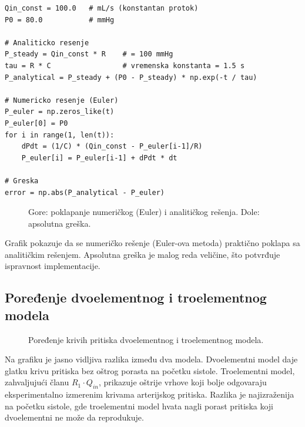 \documentclass[12pt,a4paper]{article}
\begin{document}
\begin{lstlisting}[caption={Validacija: poređenje numeričkog i analitičkog rešenja.},label={lst:valid}]
Qin_const = 100.0   # mL/s (konstantan protok)
P0 = 80.0           # mmHg

# Analiticko resenje
P_steady = Qin_const * R    # = 100 mmHg
tau = R * C                 # vremenska konstanta = 1.5 s
P_analytical = P_steady + (P0 - P_steady) * np.exp(-t / tau)

# Numericko resenje (Euler)
P_euler = np.zeros_like(t)
P_euler[0] = P0
for i in range(1, len(t)):
    dPdt = (1/C) * (Qin_const - P_euler[i-1]/R)
    P_euler[i] = P_euler[i-1] + dPdt * dt

# Greska
error = np.abs(P_analytical - P_euler)
\end{lstlisting}

\begin{figure}[H]
    \centering
    \caption{Gore: poklapanje numeričkog (Euler) i analitičkog rešenja. Dole: apsolutna greška.}
    \label{fig:valid}
\end{figure}

Grafik pokazuje da se numeričko rešenje (Euler-ova metoda) praktično poklapa sa analitičkim rešenjem. Apsolutna greška je malog reda veličine, što potvrđuje ispravnost implementacije.

\subsection{Poređenje dvoelementnog i troelementnog modela}

\begin{figure}[H]
    \centering
    \caption{Poređenje krivih pritiska dvoelementnog i troelementnog modela.}
    \label{fig:poredjenje}
\end{figure}

Na grafiku je jasno vidljiva razlika između dva modela. Dvoelementni model daje glatku krivu pritiska bez oštrog porasta na početku sistole. Troelementni model, zahvaljujući članu $R_1\cdot Q_{in}$, prikazuje oštrije vrhove koji bolje odgovaraju eksperimentalno izmerenim krivama arterijskog pritiska. Razlika je najizraženija na početku sistole, gde troelementni model hvata nagli porast pritiska koji dvoelementni ne može da reprodukuje.
\end{document}
